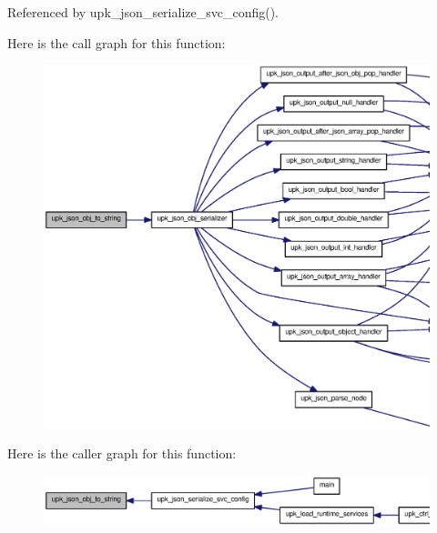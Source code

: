 Referenced by upk\_\-json\_\-serialize\_\-svc\_\-config().



Here is the call graph for this function:\nopagebreak
\begin{figure}[H]
\begin{center}
\leavevmode
\includegraphics[width=400pt]{upk__json_8c_a40b01bf12283a69e42e025934ef029b0_cgraph}
\end{center}
\end{figure}




Here is the caller graph for this function:\nopagebreak
\begin{figure}[H]
\begin{center}
\leavevmode
\includegraphics[width=400pt]{upk__json_8c_a40b01bf12283a69e42e025934ef029b0_icgraph}
\end{center}
\end{figure}


